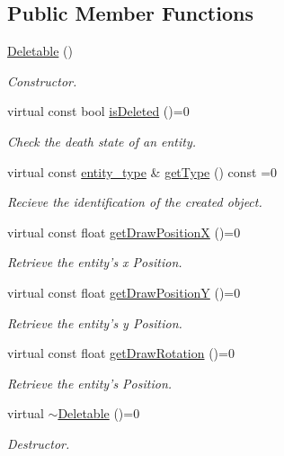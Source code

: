 \subsection*{Public Member Functions}
\begin{DoxyCompactItemize}
\item 
\hyperlink{classDeletable_a0ffa30c5232f87be98552a0dc90ab4ef}{Deletable} ()
\begin{DoxyCompactList}\small\item\em Constructor. \end{DoxyCompactList}\item 
virtual const bool \hyperlink{classDeletable_a6572440c291077cf52bf21288c6cd25c}{is\-Deleted} ()=0
\begin{DoxyCompactList}\small\item\em Check the death state of an entity. \end{DoxyCompactList}\item 
virtual const \hyperlink{Structures_8h_a6d8f83e710b27d4f86c45f0bb77066e3}{entity\-\_\-type} \& \hyperlink{classDeletable_af8a0208abc297180873692f4215fe50f}{get\-Type} () const =0
\begin{DoxyCompactList}\small\item\em Recieve the identification of the created object. \end{DoxyCompactList}\item 
virtual const float \hyperlink{classDeletable_ac14ea0c5986d50ba3ba454f89c87b8fe}{get\-Draw\-Position\-X} ()=0
\begin{DoxyCompactList}\small\item\em Retrieve the entity's x Position. \end{DoxyCompactList}\item 
virtual const float \hyperlink{classDeletable_a2a88d7e40c56902a3d3d8f668e9d126d}{get\-Draw\-Position\-Y} ()=0
\begin{DoxyCompactList}\small\item\em Retrieve the entity's y Position. \end{DoxyCompactList}\item 
virtual const float \hyperlink{classDeletable_ad7061a6bef3efce030aa5abbc7646d47}{get\-Draw\-Rotation} ()=0
\begin{DoxyCompactList}\small\item\em Retrieve the entity's Position. \end{DoxyCompactList}\item 
virtual \hyperlink{classDeletable_a20633231281c5a7110389a3f416f4989}{$\sim$\-Deletable} ()=0
\begin{DoxyCompactList}\small\item\em Destructor. \end{DoxyCompactList}\end{DoxyCompactItemize}



